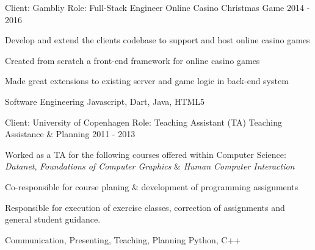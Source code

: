 \begin{cventries}
\cventry
{Client: Gambliy \newline Role: Full-Stack Engineer} %
{Online Casino Christmas Game} %
{}%
{2014 - 2016} %
{ %
\begin{cvitems}
    \item {Develop and extend the clients codebase to support and host online casino games}
    \item {Created from scratch a front-end framework for online casino games}
    \item {Made great extensions to existing server and game logic in back-end system}
\end{cvitems}
\cventrykeywords
{Software Engineering}
{Javascript, Dart, Java, HTML5}
}

\cventry
{Client: University of Copenhagen \newline Role: Teaching Assistant (TA)} %
{Teaching Assistance \& Planning} %
{}%
{2011 - 2013} %
{ %
\begin{cvitems}
    \item {Worked as a TA for the following courses offered within Computer Science: \textit{Datanet}, \textit{Foundations of Computer Graphics} \& \textit{Human Computer Interaction}}
    \item {Co-responsible for course planing \& development of programming assignments}
    \item {Responsible for execution of exercise classes, correction of assignments and general student guidance.}
\end{cvitems}
\cventrykeywords
{Communication, Presenting, Teaching, Planning}
{Python, C++}
}


\end{cventries}
